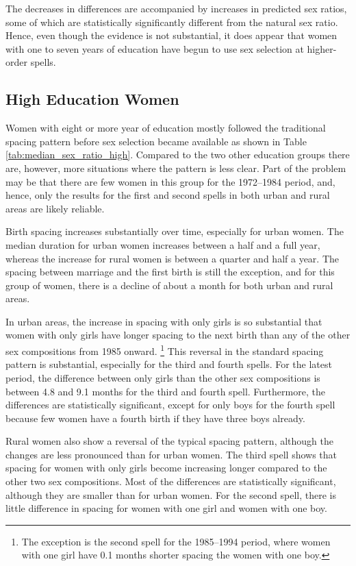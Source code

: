 \documentclass[12pt,letterpaper]{article}
\begin{document}
The decreases in differences are accompanied by increases
in predicted sex ratios, some of which are statistically 
significantly different from the natural sex ratio.
Hence, even though the evidence is not substantial, it does
appear that women with one to seven years of education 
have begun to use sex selection at higher-order spells.

\subsection{High Education Women}



Women with eight or more year of education mostly followed 
the traditional spacing pattern before sex selection became 
available as shown in Table \ref{tab:median_sex_ratio_high}.
Compared to the two other education groups there are,
however, more situations where the pattern is less clear.
Part of the problem may be that there are few women in
this group for the 1972--1984 period, and, hence, only 
the results for the first and second spells in both urban 
and rural areas are likely reliable.


Birth spacing increases substantially over time, 
especially for urban women. 
The median duration for urban women increases between a half
and a full year, whereas the increase for rural women 
is between a quarter and half a year.
The spacing between marriage and the first birth is still the
exception, and for this group of women, there is a decline of
about a month for both urban and rural areas.


In urban areas, the increase in spacing with only girls is so 
substantial that women with only girls have longer spacing to the 
next birth than any of the other sex compositions from 1985 onward.%
\footnote{
The exception is the second spell for the 1985--1994 period, where women
with one girl have 0.1 months shorter spacing the women with one boy.
}
This reversal in the standard spacing pattern is substantial, 
especially for the third and fourth spells.
For the latest period, the difference between only girls than the
other sex compositions is between 4.8 and 9.1 months for the third
and fourth spell.
Furthermore, the differences are statistically significant, except
for only boys for the fourth spell because few women have a fourth
birth if they have three boys already.


Rural women also show a reversal of the typical spacing pattern,
although the changes are less pronounced than for urban women.
The third spell shows that spacing for women with only girls become
increasing longer compared to the other two sex compositions.
Most of the differences are statistically significant, although they are 
smaller than for urban women.
For the second spell, there is little difference in spacing for
women with one girl and women with one boy.
\end{document}

